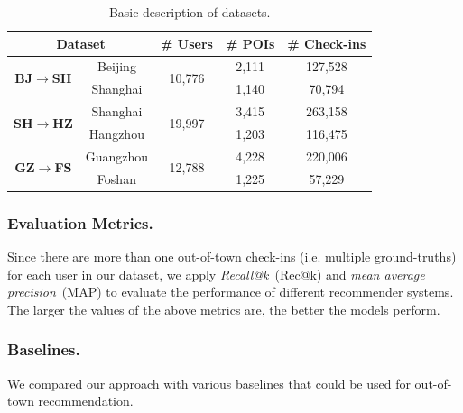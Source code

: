 \documentclass[letterpaper]{article} %
\newcommand{\bjsh}{{\bf BJ\ensuremath{\rightarrow}SH}}
\newcommand{\shhz}{{\bf SH\ensuremath{\rightarrow}HZ}}
\newcommand{\gzfs}{{\bf GZ\ensuremath{\rightarrow}FS}}
\begin{document}
\begin{table}[t]
    \tabcolsep 0.06in
    \caption{Basic description of datasets.} \label{tab:dataset}
    \begin{center}
    \begin{tabular}{ c|c|c|c|c }
      \toprule
      \multicolumn{2}{c|}{Dataset}   & \# Users  & \# POIs   & \# Check-ins  %
      \\ \hline \hline
      \multirow{2}{*}{\bjsh}
        & Beijing   & \multirow{2}{*}{10,776}   & 2,111 & 127,528   %
      \\ \cline{2-2}\cline{4-5}
        & Shanghai  &                           & 1,140 & 70,794    %
      \\ \hline
        \multirow{2}{*}{\shhz}
        & Shanghai  & \multirow{2}{*}{19,997}   & 3,415 & 263,158   %
      \\ \cline{2-2}\cline{4-5}
        & Hangzhou  &                           & 1,203 & 116,475   %
      \\ \hline
      \multirow{2}{*}{\gzfs}
        & Guangzhou & \multirow{2}{*}{12,788}   & 4,228 & 220,006   %
      \\ \cline{2-2}\cline{4-5}
        & Foshan    &                           & 1,225 & 57,229    %
      \\
      \bottomrule
  \end{tabular}
  \end{center}
\end{table}


\subsubsection{Evaluation Metrics.}
Since there are more than one out-of-town check-ins (i.e. multiple ground-truths) for each user in our dataset,
we apply \textit{Recall@k}~(Rec@k) and \textit{mean average precision}~(MAP) to evaluate the performance of different recommender systems.
The larger the values of the above metrics are, the better the models perform.


\subsubsection{Baselines.}
We compared our approach with various baselines that could be used for out-of-town recommendation.
\end{document}
